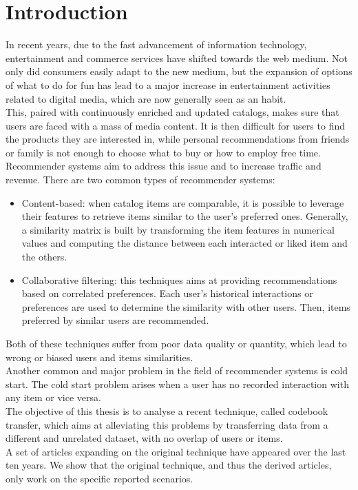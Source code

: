 \chapter{Introduction}

In recent years, due to the fast advancement of information technology, entertainment and commerce services have shifted towards the web medium.
Not only did consumers easily adapt to the new medium, but the expansion of options of what to do for fun has lead to a major increase in entertainment activities related to digital media, which are now generally seen as an habit.\\
This, paired with continuously enriched and updated catalogs, makes sure that users are faced with a mass of media content. It is then difficult for users to find the products they are interested in, while personal recommendations from friends or family is not enough to choose what to buy or how to employ free time.\\

Recommender systems aim to address this issue and to increase traffic and revenue.
There are two common types of recommender systems:
\begin{itemize}
\item Content-based: when catalog items are comparable, it is possible to leverage their features to retrieve items similar to the user's preferred ones. Generally, a similarity matrix is built by transforming the item features in numerical values and computing the distance between each interacted or liked item and the others.
\item Collaborative filtering: this techniques aims at providing recommendations based on correlated preferences. Each user's historical interactions or preferences are used to determine the similarity with other users. Then, items preferred by similar users are recommended.
\end{itemize}

Both of these techniques suffer from poor data quality or quantity, which lead to wrong or biased users and items similarities.\\

Another common and major problem in the field of recommender systems is cold start.
The cold start problem arises when a user has no recorded interaction with any item or vice versa.\\

The objective of this thesis is to analyse a recent technique, called codebook transfer, which aims at alleviating this problems by transferring data from a different and unrelated dataset, with no overlap of users or items.\\
A set of articles expanding on the original technique have appeared over the last ten years.
We show that the original technique, and thus the derived articles, only work on the specific reported scenarios.

